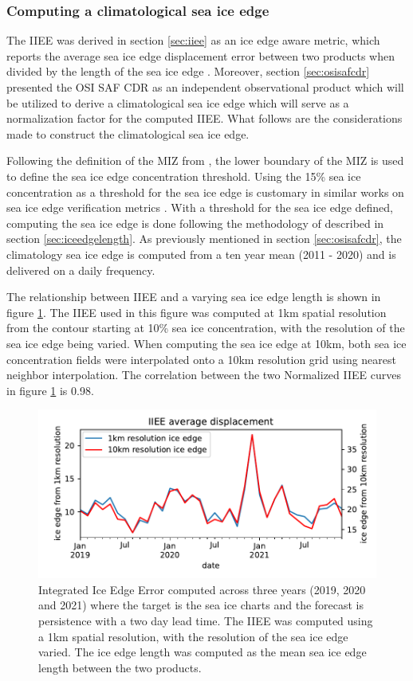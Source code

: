 \documentclass[../main/thesis]{subfiles}
\begin{document}
\subsubsection{Computing a climatological sea ice edge}
\label{sec:clim_iceedge_compute}
The IIEE \citep{Goessling2016} was derived in section \ref{sec:iiee} as an ice edge aware metric, which reports the average sea ice edge displacement error between two products when divided by the length of the sea ice edge \citep{Melsom2019}. Moreover, section \ref{sec:osisafcdr} presented the OSI SAF CDR as an independent observational product which will be utilized to derive a climatological sea ice edge which will serve as a normalization factor for the computed IIEE. What follows are the considerations made to construct the climatological sea ice edge.

Following the definition of the MIZ from \citet{Strong2012}, the lower boundary of the MIZ is used to define the sea ice edge concentration threshold. Using the 15\% sea ice concentration as a threshold for the sea ice edge is customary in similar works on sea ice edge verification metrics \citep{Dukhovskoy2015,Goessling2016,Goessling2018,Melsom2019}. With a threshold for the sea ice edge defined, computing the sea ice edge is done following the methodology of \citet{Melsom2019} described in section \ref{sec:iceedgelength}. As previously mentioned in section \ref{sec:osisafcdr}, the climatology sea ice edge is computed from a ten year mean (2011 - 2020) and is delivered on a daily frequency.

The relationship between IIEE and a varying sea ice edge length is shown in figure \ref{fig:iiee_1km_10km}. The IIEE used in this figure was computed at 1km spatial resolution from the contour starting at 10\% sea ice concentration, with the resolution of the sea ice edge being varied. When computing the sea ice edge at 10km, both sea ice concentration fields were interpolated onto a 10km resolution grid using nearest neighbor interpolation. The correlation between the two Normalized IIEE curves in figure \ref{fig:iiee_1km_10km} is 0.98.

\begin{figure}
    \centering
    \includegraphics[width=.62\textwidth]{normalized_iiee}
    \caption{\label{fig:iiee_1km_10km}Integrated Ice Edge Error computed across three years (2019, 2020 and 2021) where the target is the sea ice charts and the forecast is persistence with a two day lead time. The IIEE was computed using a 1km spatial resolution, with the resolution of the sea ice edge varied. The ice edge length was computed as the mean sea ice edge length between the two products.}
\end{figure}
\end{document}
